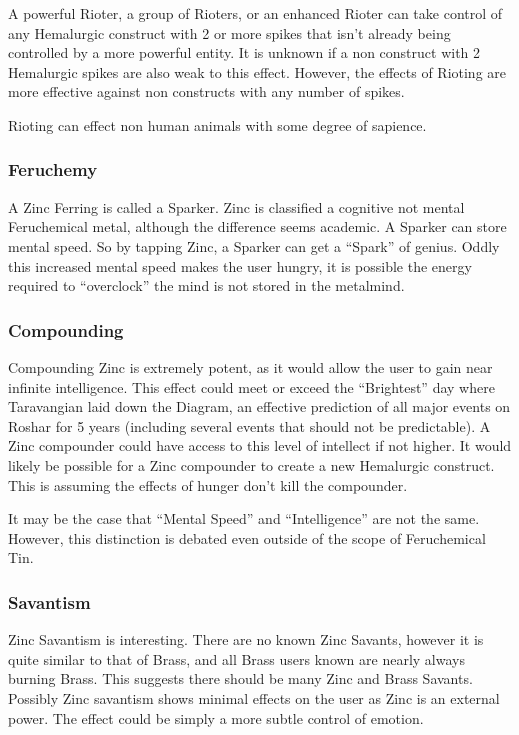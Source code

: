 \documentclass[conference]{IEEEtran}
\begin{document}
A powerful Rioter,\cite{WoF} a group of Rioters,\cite{HoA-CH5} or an enhanced Rioter\cite{WoA-CH54} can take control of any Hemalurgic construct\cite{WoA-CH40}\cite{WoA-CH54} with 2\cite{WoA-CH40} or more spikes that isn't already being controlled by a more powerful entity.\cite{HoA-CH3}  It is unknown if a non construct with 2 Hemalurgic spikes are also weak to this effect.  However, the effects of Rioting are more effective against non constructs with any number of spikes.  

Rioting can effect non human animals with some degree of sapience.\cite{riot-animal}\\
\subsubsection*{\textbf{Feruchemy}}
A Zinc Ferring is called a Sparker.\cite{ARS}  Zinc is classified a cognitive not mental Feruchemical metal, although the difference seems academic.\cite{FE-TB}  A Sparker can store mental speed.  So by tapping Zinc, a Sparker can get a ``Spark'' of genius.\cite{ARS}  Oddly this increased mental speed makes the user hungry,\cite{BoM-CH3} it is possible the energy required to ``overclock'' the mind is not stored in the metalmind.\\
\subsubsection*{\textbf{Compounding}}
Compounding Zinc is extremely potent, as it would allow the user to gain near infinite intelligence.  This effect could meet or exceed the ``Brightest'' day where Taravangian laid down the Diagram, an effective prediction of all major events on Roshar for 5 years (including several events that should not be predictable).\cite{WoR}\cite{OB-CH122}  A Zinc compounder could have access to this level of intellect if not higher.  It would likely be possible for a Zinc compounder to create a new Hemalurgic construct.  This is assuming the effects of hunger don't kill the compounder.

It may be the case that ``Mental Speed'' and ``Intelligence'' are not the same.\cite{MSI-N}  However, this distinction is debated even outside of the scope of Feruchemical Tin.\cite{MSI-P1}\cite{MSI-P2}\cite{MSI-P3}
\\
\subsubsection*{\textbf{Savantism}}
Zinc Savantism is interesting.  There are no known Zinc Savants,\cite{WoF} however it is quite similar to that of Brass, and all Brass users known are nearly always burning Brass.\cite{WoA-CH11}  This suggests there should be many Zinc and Brass Savants.  Possibly Zinc savantism shows minimal effects on the user as Zinc is an external power.  The effect could be simply a more subtle control of emotion.
\end{document}
